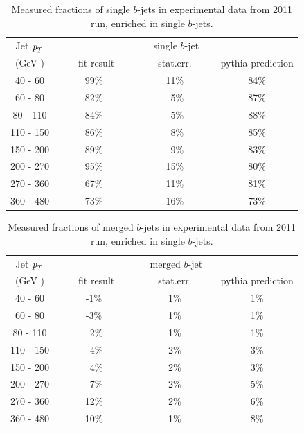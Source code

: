 \begin{table}[!hbt] %
\renewcommand{\arraystretch}{1.2}
\centering
\begin{tabular}{ | c || c | c | c ||}
  \hline
  Jet ${\emph{p}_{T}}$ & \multicolumn{3}{c||}{single $b$-jet}\\ \cline{2-4}
    (GeV ) & ~~~~fit result~~~ & ~~~~stat.err.~~~~ & pythia prediction \\ \hline
   40 - 60 &  99\%  &  11\%  &  84\% \\  
   60 - 80 &  82\%  &  ~5\%  &  87\% \\ 
   80 - 110&  84\%  &  ~5\%  &  88\% \\ 
  110 - 150&  86\%  &  ~8\%  &  85\% \\ 
  150 - 200&  89\%  &  ~9\%  &  83\% \\ 
  200 - 270&  95\%  &  15\%  &  80\% \\ 
  270 - 360&  67\%  &  11\%  &  81\% \\ 
  360 - 480&  73\%  &  16\%  &  73\% \\ \hline
\end{tabular}
\caption{Measured fractions of single $b$-jets in experimental data from 2011 run, enriched in single $b$-jets.}
\label{tb:fitfractions2btagS}
\end{table}

\begin{table}[!hbt] %
\renewcommand{\arraystretch}{1.2}
\centering
\begin{tabular}{ | c || c | c | c ||}
  \hline
  Jet ${\emph{p}_{T}}$ & \multicolumn{3}{c||}{merged $b$-jet}\\ \cline{2-4}
    (GeV ) & ~~~~fit result~~~ & ~~~~stat.err.~~~~ & pythia prediction \\ \hline
   40 - 60 &  -1\%  &  1\%  &  1\% \\  
   60 - 80 &  -3\%  &  1\%  &  1\% \\ 
   80 - 110&  ~2\%  &  1\%  &  1\% \\ 
  110 - 150&  ~4\%  &  2\%  &  3\% \\ 
  150 - 200&  ~4\%  &  2\%  &  3\% \\ 
  200 - 270&  ~7\%  &  2\%  &  5\% \\ 
  270 - 360&  12\%  &  2\%  &  6\% \\ 
  360 - 480&  10\%  &  1\%  &  8\% \\ \hline
\end{tabular}
\caption{Measured fractions of merged $b$-jets in experimental data from 2011 run, enriched in single $b$-jets.}
\label{tb:fitfractions2btagM}
\end{table}

